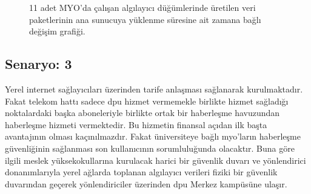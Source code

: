 \begin{figure}[htbp]
\centering



\caption{11 adet MYO'da çalışan algılayıcı düğümlerinde üretilen veri paketlerinin ana sunucuya yüklenme süresine ait zamana bağlı değişim grafiği.}
\label{fig:4-38}
\end{figure}

\newpage
\subsection{Senaryo: 3}\label{fibeeraciklama}


Yerel internet sağlayıcıları üzerinden tarife anlaşması sağlanarak kurulmaktadır. Fakat telekom hattı sadece \gls{dpu} hizmet vermemekle birlikte hizmet sağladığı noktalardaki başka aboneleriyle birlikte ortak bir haberleşme havuzundan haberleşme hizmeti vermektedir. Bu hizmetin finansal açıdan ilk başta avantajının olması kaçınılmazdır. Fakat üniversiteye bağlı \gls{myo}'ların haberleşme güvenliğinin sağlanması son kullanıcının sorumluluğunda olacaktır. Buna göre ilgili meslek yüksekokullarına kurulacak harici bir güvenlik duvarı ve yönlendirici donanımlarıyla yerel ağlarda toplanan algılayıcı verileri fiziki bir güvenlik duvarından geçerek yönlendiriciler üzerinden \gls{dpu} Merkez kampüsüne ulaşır.


